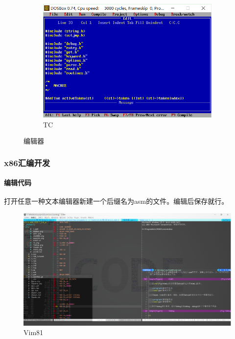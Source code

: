 \documentclass{ctexart}
\begin{document}
	\begin{figure}[htpb]
		\centering
		\begin{subfigure}[htpb]{0\linewidth}
		\end{subfigure}

		\setcounter{subfigure}{2}
		\begin{subfigure}[htpb]{.7\linewidth}
			\centering
			\includegraphics[width=\linewidth]{TC.png}
			\caption{TC}
			\label{fig:TC}
		\end{subfigure}
		\caption{编辑器}
		\label{fig:编辑器}
	\end{figure}

	\newpage

	\subsubsection{x86汇编开发}%
	\label{ssub:x86汇编开发}

	\paragraph{编辑代码}%
	\label{par:编辑代码}

	打开任意一种文本编辑器新建一个后缀名为asm的文件。编辑后保存就行。

	\begin{figure}[htpb]
		\centering
		\includegraphics[width=0.6\linewidth]{Vim81}
		\caption{Vim81}
		\label{fig:Vim81}
	\end{figure}
\end{document}
